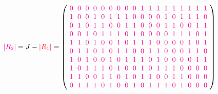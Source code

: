 \documentclass{beamer}
\newcommand{\RR}[1]{\textcolor{red}{#1}}
\newcommand{\MM}[1]{\textcolor{magenta}{#1}}
\newcommand{\abs}[1]{|#1|}
\begin{document}
\begin{frame}

  \[
    \MM{\abs{R_2}} = J-\RR{\abs{R_1}} =
    \left(
      \arraycolsep=3.0pt\def\arraystretch{1.0}
      \begin{array}{cccccccccccccccccc}
        \MM{0}&\MM{0}&\MM{0}&\MM{0}&\MM{0}&\MM{0}&\MM{0}&\MM{0}&\MM{0}&\MM{1}&\MM{1}&\MM{1}&\MM{1}&\MM{1}&\MM{1}&\MM{1}&\MM{1}&\MM{1}\\
        \MM{1}&\MM{0}&\MM{0}&\MM{1}&\MM{0}&\MM{1}&\MM{1}&\MM{1}&\MM{0}&\MM{0}&\MM{0}&\MM{0}&\MM{1}&\MM{0}&\MM{1}&\MM{1}&\MM{1}&\MM{0}\\
        \MM{0}&\MM{1}&\MM{0}&\MM{1}&\MM{1}&\MM{0}&\MM{0}&\MM{1}&\MM{1}&\MM{0}&\MM{0}&\MM{0}&\MM{1}&\MM{1}&\MM{0}&\MM{0}&\MM{1}&\MM{1}\\
        \MM{0}&\MM{0}&\MM{1}&\MM{0}&\MM{1}&\MM{1}&\MM{1}&\MM{0}&\MM{1}&\MM{0}&\MM{0}&\MM{0}&\MM{0}&\MM{1}&\MM{1}&\MM{1}&\MM{0}&\MM{1}\\
        \MM{1}&\MM{1}&\MM{0}&\MM{1}&\MM{0}&\MM{0}&\MM{1}&\MM{0}&\MM{1}&\MM{1}&\MM{1}&\MM{0}&\MM{0}&\MM{0}&\MM{0}&\MM{1}&\MM{0}&\MM{1}\\
        \MM{0}&\MM{1}&\MM{1}&\MM{0}&\MM{1}&\MM{0}&\MM{1}&\MM{1}&\MM{0}&\MM{0}&\MM{1}&\MM{1}&\MM{0}&\MM{0}&\MM{0}&\MM{1}&\MM{1}&\MM{0}\\
        \MM{1}&\MM{0}&\MM{1}&\MM{0}&\MM{0}&\MM{1}&\MM{0}&\MM{1}&\MM{1}&\MM{1}&\MM{0}&\MM{1}&\MM{0}&\MM{0}&\MM{0}&\MM{0}&\MM{1}&\MM{1}\\
        \MM{1}&\MM{0}&\MM{1}&\MM{1}&\MM{1}&\MM{0}&\MM{1}&\MM{0}&\MM{0}&\MM{1}&\MM{0}&\MM{1}&\MM{1}&\MM{1}&\MM{0}&\MM{0}&\MM{0}&\MM{0}\\
        \MM{1}&\MM{1}&\MM{0}&\MM{0}&\MM{1}&\MM{1}&\MM{0}&\MM{1}&\MM{0}&\MM{1}&\MM{1}&\MM{0}&\MM{0}&\MM{1}&\MM{1}&\MM{0}&\MM{0}&\MM{0}\\
        \MM{0}&\MM{1}&\MM{1}&\MM{1}&\MM{0}&\MM{1}&\MM{0}&\MM{0}&\MM{1}&\MM{0}&\MM{1}&\MM{1}&\MM{1}&\MM{0}&\MM{1}&\MM{0}&\MM{0}&\MM{0}\\
      \end{array}
    \right)
  \]
  
\end{frame}
\end{document}
